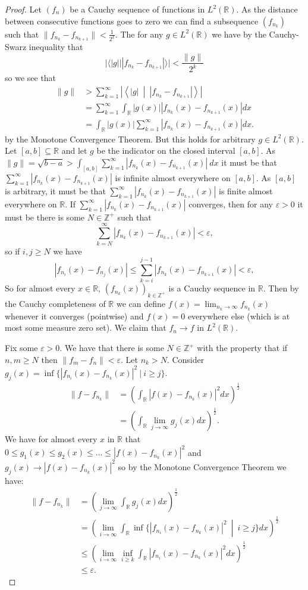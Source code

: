 \documentclass{report}
\newcommand{\Z}{\mathbb{Z}}
\newcommand{\R}{\mathbb{R}}
\begin{document}
\begin{proof}
Let $(f_n)$ be a Cauchy sequence of functions in $L^2 (\R )$. 
As the distance between consecutive functions goes to zero we can find a subsequence $(f_{n_k})$ such that $\|f_{n_k}-f_{n_{k+1}}\|<\frac 1 {2^k}$. 
The for any $g \in L^2 (\R )$ we have by the Cauchy-Swarz inequality that
$$
|\langle |g| | |f_{n_k}-f_{n_{k+1}}| \rangle| < \frac{\| g\|}{2^k}
$$
so we see that
\begin{align*}
{\| g\|} &> \sum_{k=1}^\infty \left | \left \langle |g| \ \middle | \ |f_{n_k}-f_{n_{k+1}}| \right \rangle \right | \\
&= \sum_{k=1}^\infty \int_\R |g(x)| |f_{n_k}(x)-f_{n_{k+1}}(x)|  dx\\
&=\int_\R |g(x)|  \sum_{k=1}^\infty  |f_{n_k}(x)-f_{n_{k+1}}(x)|  dx.
\end{align*}
by the Monotone Convergence Theorem. But this holds for arbitrary $g \in L^2(\R)$. Let $[a,b] \subseteq \R$ and let $g$ be the indicator
on the closed interval $[a,b]$. As $\|g\|=\sqrt{b-a}> \int_{[a,b]} \sum_{k=1}^\infty |f_{n_k}(x)-f_{n_{k+1}}(x)| \ dx$ it must be that  $\sum_{k=1}^\infty |f_{n_k}(x)-f_{n_{k+1}}(x)|$ is infinite 
almost everywhere on $[a,b]$. As $[a,b]$ is arbitrary, it must be that $\sum_{k=1}^\infty |f_{n_k}(x)-f_{n_{k+1}}(x)|$
is finite almost everywhere on $\R$. If $\sum_{k=1}^\infty |f_{n_k}(x)-f_{n_{k+1}}(x)|$ converges, then for any $\varepsilon > 0$ it must be there is some $N \in \Z^+$ such that
$$\sum_{k=N}^\infty |f_{n_k}(x)-f_{n_{k+1}}(x)|<\varepsilon,$$ so if $i,j \geq N$ we have
$$|f_{n_i}(x)-f_{n_j}(x)| \leq \sum_{k=i}^{j-1} |f_{n_k}(x)-f_{n_{k+1}}(x)|<\varepsilon,$$
So for almost every $x \in \R$, $(f_{n_k}(x))_{k \in \Z^+}$ is a Cauchy sequence in $\R$. Then by the Cauchy completeness of $\R$ we can define $f(x)=\lim_{n_k \to \infty} f_{n_k}(x)$ whenever it converges (pointwise) and $f(x)=0$ everywhere else (which is at most some measure zero set). We claim that $f_n \to f$ in $L^2 (\R )$. 

Fix some $\varepsilon >0$. We have that there is some $N \in \Z^+$ with the property that if $n,m\geq N$ then $\| f_m-f_n\|<\varepsilon$. Let $n_k>N$.  Consider $g_j(x)=\inf \{|f_{n_i}(x)-f_{n_k}(x)|^2 \  | \ i \geq j \}$. 
\begin{align*}
\| f-f_{n_k} \|&=\left ( \int_\R |f(x)-f_{n_k}(x)|^2 dx \right )^\frac 1 2\\
&=\left ( \int_\R \lim_{j\to \infty} g_j(x) dx  \right )^\frac 1 2.
\end{align*}
We have for almost every $x$ in $\R$ that $0\leq g_1(x) \leq g_2(x) \leq \ldots \leq |f(x)-f_{n_k}(x)|^2$ and $g_j(x) \to |f(x)-f_{n_k}(x)|^2$ so by the Monotone Convergence Theorem we have:
\begin{align*}
\| f-f_{n_k} \| &= \left ( \lim_{j\to \infty} \int_\R  g_j(x) dx \right )^\frac 1 2\\
&= \left ( \lim_{i \to \infty} \int_\R \inf \{ |f_{n_i}(x)-f_{n_k}(x)|^2 \ \middle | \ i \geq j \} dx \right )^\frac 1 2\\
& \leq \left (\lim_{i \to \infty} \inf_{i \geq k} \int_\R |f_{n_i}(x)-f_{n_k}(x)|^2 dx \right )^\frac 1 2\\
&\leq \varepsilon .
\end{align*}


\end{proof}
\end{document}
